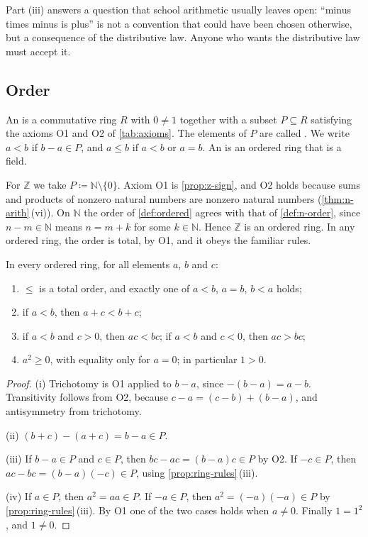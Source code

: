 Part (iii) answers a question that school arithmetic usually leaves open: ``minus times minus is plus'' is not a convention that could have been chosen otherwise, but a consequence of the distributive law. Anyone who wants the distributive law must accept it.

\subsection{Order}

\begin{definition}
\label{def:ordered}
An  is a commutative ring $R$ with $0\ne1$ together with a subset $P\subseteq R$ satisfying the axioms O1 and O2 of \cref{tab:axioms}. The elements of $P$ are called . We write $a<b$ if $b-a\in P$, and $a\le b$ if $a<b$ or $a=b$. An  is an ordered ring that is a field.
\end{definition}

For $\mathbb Z$ we take $P\coloneqq\mathbb N\setminus\{0\}$. Axiom O1 is \cref{prop:z-sign}, and O2 holds because sums and products of nonzero natural numbers are nonzero natural numbers (\cref{thm:n-arith}\,(vi)). On $\mathbb N$ the order of \cref{def:ordered} agrees with that of \cref{def:n-order}, since $n-m\in\mathbb N$ means $n=m+k$ for some $k\in\mathbb N$. Hence $\mathbb Z$ is an ordered ring. In any ordered ring, the order is total, by O1, and it obeys the familiar rules.

\begin{proposition}
\label{prop:order-rules}
In every ordered ring, for all elements $a$, $b$ and $c$:
\begin{enumerate}
\item $\le$ is a total order, and exactly one of $a<b$, $a=b$, $b<a$ holds;
\item if $a<b$, then $a+c<b+c$;
\item if $a<b$ and $c>0$, then $ac<bc$; if $a<b$ and $c<0$, then $ac>bc$;
\item $a^2\ge0$, with equality only for $a=0$; in particular $1>0$.
\end{enumerate}
\end{proposition}

\begin{proof}
(i) Trichotomy is O1 applied to $b-a$, since $-(b-a)=a-b$. Transitivity follows from O2, because $c-a=(c-b)+(b-a)$, and antisymmetry from trichotomy.

(ii) $(b+c)-(a+c)=b-a\in P$.

(iii) If $b-a\in P$ and $c\in P$, then $bc-ac=(b-a)c\in P$ by O2. If $-c\in P$, then $ac-bc=(b-a)(-c)\in P$, using \cref{prop:ring-rules}\,(iii).

(iv) If $a\in P$, then $a^2=aa\in P$. If $-a\in P$, then $a^2=(-a)(-a)\in P$ by \cref{prop:ring-rules}\,(iii). By O1 one of the two cases holds when $a\ne0$. Finally $1=1^2$, and $1\ne0$.
\end{proof}


